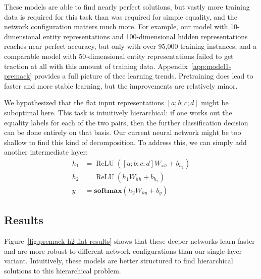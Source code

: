 \documentclass{article}
\newcommand{\Figref}[1]{Figure~\ref{#1}}
\newcommand{\Appref}[1]{Appendix~\ref{#1}}
\newcommand{\update}[1]{{\color{darkblue}#1}}
\newcommand{\softmax}{\mathbf{softmax}}
\DeclareMathOperator{\ReLU}{ReLU}
\begin{document}
These models are able to find nearly perfect solutions, but vastly more training data is required for this task than was required for simple equality, and the network configuration matters much more. For example, our model with 10-dimensional entity representations and 100-dimensional hidden representations reaches near perfect accuracy, but only with over 95,000 training instances, and a comparable model with 50-dimensional entity representations failed to get traction at all with this amount of training data. \update{\Appref{app:model1-premack} provides a full picture of thee learning trends. Pretraining does lead to faster and more stable learning, but the improvements are relatively minor.}

We hypothesized that the flat input representations $[a;b;c;d]$ might be suboptimal here. This task is intuitively hierarchical: if one works out the equality labels for each of the two pairs, then the further classification decision can be done entirely on that basis. Our current neural network might be too shallow to find this kind of decomposition.  To address this, we can simply add another intermediate layer:
%
\begin{align}
  h_{1} &= \ReLU([a;b;c;d]W_{xh} + b_{h_{1}}) \label{eq:x2h1}\\
  h_{2} &= \ReLU(h_{1}W_{hh} + b_{h_{2}}) \label{eq:x2h2}\\
  y &= \softmax(h_{2}W_{hy} + b_{y}) \label{eq:h2y2}
\end{align}


\subsection{Results}

\update{\Figref{fig:premack-h2-flat-results} shows that} these deeper networks learn faster and are more robust to different network configurations than our single-layer variant. Intuitively, these models are better structured to find hierarchical solutions to this hierarchical problem.
\end{document}
